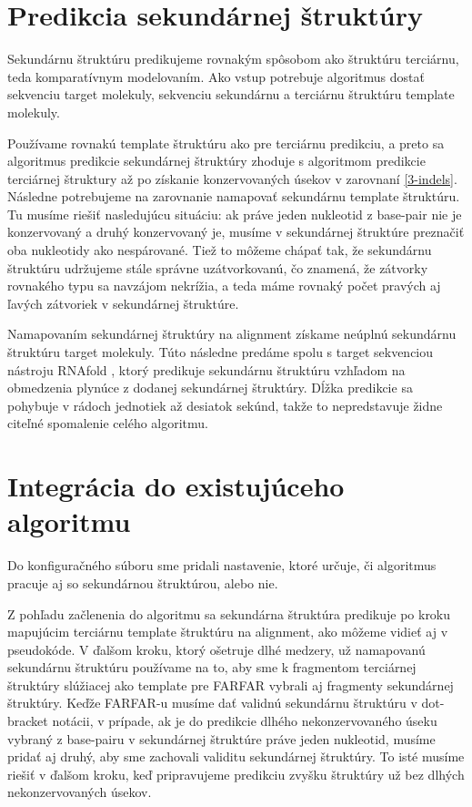 \section{Predikcia sekundárnej štruktúry}
Sekundárnu štruktúru predikujeme rovnakým spôsobom ako štruktúru terciárnu, teda komparatívnym modelovaním. Ako vstup potrebuje algoritmus dostať sekvenciu target molekuly, sekvenciu sekundárnu  a terciárnu štruktúru template molekuly. 


\indent  Používame rovnakú template štruktúru ako pre terciárnu predikciu, a preto sa algoritmus predikcie sekundárnej štruktúry zhoduje s algoritmom predikcie terciárnej štruktury až po získanie konzervovaných úsekov v zarovnaní \autoref{3-indels}. Následne potrebujeme na zarovnanie namapovať sekundárnu template štruktúru. Tu musíme riešiť nasledujúcu situáciu: ak práve jeden nukleotid z base-pair nie je konzervovaný a druhý konzervovaný je, musíme v sekundárnej štruktúre preznačiť oba nukleotidy ako nespárované. Tiež to môžeme chápať tak, že sekundárnu štruktúru udržujeme stále správne uzátvorkovanú, čo znamená, že zátvorky rovnakého typu sa navzájom nekrížia, a teda máme rovnaký počet pravých aj ľavých zátvoriek v sekundárnej štruktúre.


\indent Namapovaním sekundárnej štruktúry na alignment získame neúplnú sekundárnu štruktúru target molekuly. Túto následne predáme spolu s target sekvenciou nástroju RNAfold \cite{RNAfold}, ktorý predikuje sekundárnu štruktúru vzhľadom na obmedzenia plynúce z dodanej sekundárnej štruktúry. Dĺžka predikcie sa pohybuje v rádoch jednotiek až desiatok sekúnd, takže to nepredstavuje židne citeľné spomalenie celého algoritmu. 


\section{Integrácia do existujúceho algoritmu}
Do konfiguračného súboru sme pridali nastavenie, ktoré určuje, či algoritmus pracuje aj so sekundárnou štruktúrou, alebo nie.


\indent Z pohľadu začlenenia do algoritmu sa sekundárna štruktúra predikuje po kroku mapujúcim terciárnu template štruktúru na alignment, ako môžeme vidieť aj v pseudokóde. V ďalšom kroku, ktorý ošetruje dlhé medzery, už namapovanú sekundárnu štruktúru používame na to, aby sme k fragmentom terciárnej štruktúry slúžiacej ako template pre FARFAR vybrali aj fragmenty sekundárnej štruktúry. Keďže FARFAR-u musíme dať validnú sekundárnu štruktúru v dot-bracket notácii, v prípade, ak je do predikcie dlhého nekonzervovaného úseku vybraný z base-pairu v sekundárnej štruktúre práve jeden nukleotid, musíme pridať aj druhý, aby sme zachovali validitu sekundárnej štruktúry. To isté musíme riešiť v ďalšom kroku, keď pripravujeme predikciu zvyšku štruktúry už bez dlhých nekonzervovaných úsekov. 


